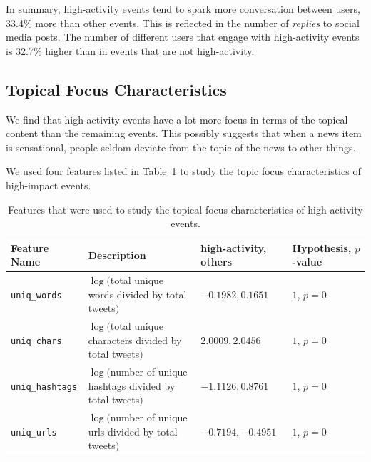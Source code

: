 
In summary, high-activity events tend to spark more conversation between users,
33.4\% more than other events. 
%
This is reflected in the number of {\em replies} to social media posts. 
%
The number of different users that engage with high-activity events is 32.7\%
higher than in events that are not high-activity. 



\subsection{Topical Focus Characteristics}
\label{subsec:topical_focus}


We find that high-activity events have a lot more focus in terms of the topical
content than the remaining events. 
%
This possibly suggests that when a news item is sensational, people seldom
deviate from the topic of the news to other things. 

We used four features listed in Table~\ref{tab:topical_focus} to study the topic
focus characteristics of high-impact events.

\begin{table}
  \centering
  {\small
    \begin{tabular}{llll}
      \toprule
      Feature Name &  \multicolumn{1}{l}{Description} & high-activity, others & Hypothesis, $p$-value\\
      \midrule
      \texttt{uniq\_words} & \pbox{20cm}{$\log($total unique words \\divided by total tweets$)$} & $-0.1982, 0.1651$ & $1$, $p = 0$ \\
      \midrule
      \texttt{uniq\_chars} & \pbox{20cm}{$\log($total unique characters \\divided by total tweets$)$} & $2.0009, 2.0456$ & $1$, $p = 0$ \\
      \midrule
      \texttt{uniq\_hashtags} & \pbox{20cm}{$\log($number of unique hashtags\\ divided by total tweets$)$} & $-1.1126, 0.8761$ & $1$, $p = 0$ \\
      \midrule
      \texttt{uniq\_urls} & \pbox{20cm}{$\log($number of unique urls \\divided by total tweets$)$} & $-0.7194, -0.4951$ & $1$, $p = 0$ \\
      \bottomrule
    \end{tabular}
  } \caption[Topical focus features of events]{Features that were used to study
  the topical focus characteristics of high-activity events.}
  \label{tab:topical_focus}
\end{table}

